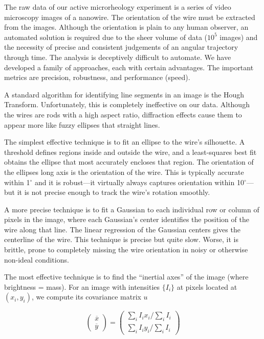 The raw data of our active microrheology experiment is a series of video microscopy images of a nanowire. The orientation of the wire must be extracted from the images. Although the orientation is plain to any human observer, an automated solution is required due to the sheer volume of data ($10^5$ images) and the necessity of precise and consistent judgements of an angular trajectory through time. The analysis is deceptively difficult to automate. We have developed a family of approaches, each with certain advantages. The important metrics are precision, robustness, and performance (speed).

A standard algorithm for identifying line segments in an image is the Hough Transform. Unfortunately, this is completely ineffective on our data. Although the wires are rods with a high aspect ratio, diffraction effects cause them to appear more like fuzzy ellipses that straight lines.

The simplest effective technique is to fit an ellipse to the wire's silhouette. A threshold defines regions inside and outside the wire, and a least-squares best fit obtains the ellipse that most accurately encloses that region. The orientation of the ellipses long axis is the orientation of the wire. This is typically accurate within 1$^\circ$ and it is robust---it virtually always captures orientation within 10$^\circ$---but it is not precise enough to track the wire's rotation smoothly.

A more precise technique is to fit a Gaussian to each individual row or column of pixels in the image, where each Gaussian's center identifies the position of the wire along that line. The linear regression of the Gaussian centers gives the centerline of the wire. This technique is precise but quite slow. Worse, it is brittle, prone to completely missing the wire orientation in noisy or otherwise non-ideal conditions.

The most effective technique is to find the ``inertial axes'' of the image (where brightness = mass). For an image with intensities $\{I_i\}$ at pixels located at ${(x_i, y_i)}$, we compute its covariance matrix $u$

\begin{equation}
\left( \begin{array}{c}
\overline{x} \\
\overline{y} \end{array} \right)
= \left( \begin{array}{c}
\sum_{i} I_i x_i / \sum_i I_i \\
\sum_{i} I_i y_i / \sum_i I_i \end{array} \right)
\end{equation}

